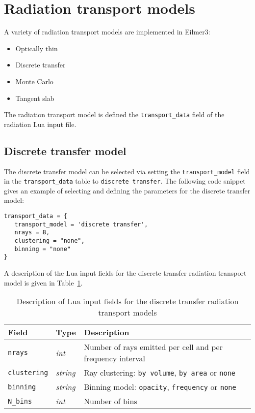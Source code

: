 \section{Radiation transport models}
\label{app:rt-models}

A variety of radiation transport models are implemented in Eilmer3:

\begin{itemize}
 \item Optically thin
 \item Discrete transfer
 \item Monte Carlo
 \item Tangent slab
\end{itemize}

The radiation transport model is defined the \texttt{transport\_data} field of the radiation Lua input file.

\subsection{Discrete transfer model}

The discrete transfer model can be selected via setting the \texttt{transport\_model} field in the \texttt{transport\_data} table to	 \texttt{discrete transfer}.
The following code snippet gives an example of selecting and defining the parameters for the discrete transfer model:

\noindent \topbar
\begin{lstlisting}[basicstyle=\ttfamily\normalsize]
transport_data = {
   transport_model = 'discrete transfer',
   nrays = 8,
   clustering = "none",
   binning = "none"
}
\end{lstlisting}
\bottombar

A description of the Lua input fields for the discrete transfer radiation transport model is given in Table~\ref {tab:DTM-input}.

\begin{table}[h]
 \begin{center}
  \caption{Description of Lua input fields for the discrete transfer radiation transport models}
  \label{tab:DTM-input}
\begin{tabular}{llp{8cm}}
 \hline \hline
 Field                        & Type              &  Description \\ \hline
\texttt{nrays}            & \textit{int}       &  Number of rays emitted per cell and per frequency interval \\
\texttt{clustering}    & \textit{string}  &  Ray clustering: \texttt{by volume}, \texttt{by area} or \texttt{none} \\
\texttt{binning}        & \textit{string}  &  Binning model: \texttt{opacity}, \texttt{frequency} or \texttt{none} \\
\texttt{N\_bins}         & \textit{int}       &  Number of bins \\
\hline
\end{tabular}
\end{center}
\end{table}

